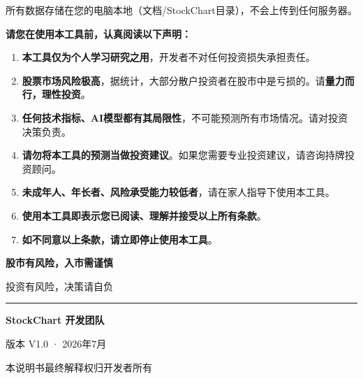\documentclass[14pt,a4paper]{ctexart}
\newcommand{\sectitle}[1]{\vspace{1em}{\Large\bfseries\color{darkwarning} #1}\vspace{0.3em}}
\begin{document}
\vspace{0.8em}
\begin{tcolorbox}[colback=gray!10!white,colframe=gray!70!black,title=\textbf{Q5：我的数据安全吗？},fonttitle=\bfseries]
所有数据存储在您的电脑本地（文档/StockChart目录），不会上传到任何服务器。
\end{tcolorbox}

\newpage

\sectitle{第六部分：最终免责声明}

\begin{tcolorbox}[colback=red!2!white,colframe=red!80!black,title=\textbf{🔴 最终声明 · 请务必阅读},fonttitle=\bfseries\Huge]
\begin{center}
{\Large\bfseries 请您在使用本工具前，认真阅读以下声明：}
\end{center}

\vspace{1em}
\begin{enumerate}[leftmargin=2em]
  \item \textbf{本工具仅为个人学习研究之用}，开发者不对任何投资损失承担责任。
  
  \item \textbf{股票市场风险极高}，据统计，大部分散户投资者在股市中是亏损的。请\textbf{量力而行，理性投资}。
  
  \item \textbf{任何技术指标、AI模型都有其局限性}，不可能预测所有市场情况。请对投资决策负责。
  
  \item \textbf{请勿将本工具的预测当做投资建议}。如果您需要专业投资建议，请咨询持牌投资顾问。
  
  \item \textbf{未成年人、年长者、风险承受能力较低者}，请在家人指导下使用本工具。
  
  \item \textbf{使用本工具即表示您已阅读、理解并接受以上所有条款}。
  
  \item \textbf{如不同意以上条款，请立即停止使用本工具}。
\end{enumerate}

\vspace{1.5em}
\begin{center}
{\Large\bfseries\color{warningred} 股市有风险，入市需谨慎}

\vspace{0.5em}
{\large 投资有风险，决策请自负}
\end{center}
\end{tcolorbox}

\vspace{2em}
\begin{center}
\rule{0.6\textwidth}{0.5pt}

\vspace{1em}
{\large \textbf{StockChart 开发团队}}

\vspace{0.3em}
{\normalsize 版本 V1.0 · 2026年7月}

\vspace{1em}
{\normalsize 本说明书最终解释权归开发者所有}
\end{center}
\end{document}

